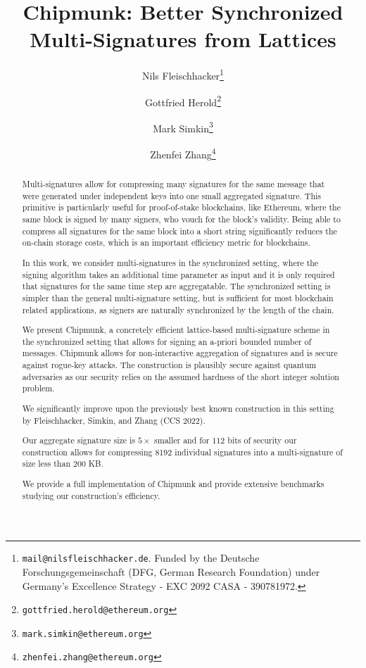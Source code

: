 \documentclass[11pt]{llncs}
\title{Chipmunk: Better Synchronized Multi-Signatures from Lattices}
\author{
 	Nils Fleischhacker\inst{1}\thanks{\texttt{mail@nilsfleischhacker.de}. Funded by the Deutsche Forschungsgemeinschaft (DFG, German Research Foundation) under Germany's Excellence Strategy - EXC 2092 CASA - 390781972.}%
 	\and
 	Gottfried Herold\inst{2}\thanks{\texttt{gottfried.herold@ethereum.org}}%
 	\and
 	Mark Simkin\inst{2}\thanks{\texttt{mark.simkin@ethereum.org}}%
   \and
   Zhenfei Zhang\inst{2}\thanks{\texttt{zhenfei.zhang@ethereum.org}}%
}
\institute{
	 Ruhr University Bochum
	 \and
	 Ethereum Foundation
}
\newif\ifcameraready
\begin{document}
\pagestyle{plain}

\maketitle
\noindent
\makebox[\linewidth]{\small \today}

\begin{abstract}
Multi-signatures allow for compressing many signatures for the same message that were generated under independent keys into one small aggregated signature. 
This primitive is particularly useful for proof-of-stake blockchains, like Ethereum, where the same block is signed by many signers, who vouch for the block's validity.
Being able to compress all signatures for the same block into a short string significantly reduces the on-chain storage costs, which is an important efficiency metric for blockchains.

In this work, we consider multi-signatures in the synchronized setting, where the signing algorithm takes an additional time parameter as input and it is only required that signatures for the same time step are aggregatable.
The synchronized setting is simpler than the general multi-signature setting, but is sufficient for most blockchain related applications, as signers are naturally synchronized by the length of the chain.

We present Chipmunk, a concretely efficient lattice-based multi-signature scheme in the synchronized setting that allows for signing an a-priori bounded number of messages.
Chipmunk allows for non-interactive aggregation of signatures and is secure against rogue-key attacks.
The construction is plausibly secure against quantum adversaries as our security relies on the assumed hardness of the short integer solution problem.

We significantly improve upon the previously best known construction in this setting by Fleischhacker, Simkin, and Zhang (CCS 2022).
\ifcameraready
Our aggregate signature size is $5 \times$ smaller and for $112$ bits of security our construction allows for compressing 8192 individual signatures into a multi-signature of size less than $200$ KB.
\else
Our aggregate signature size is $5 \times$ smaller and for $112$ bits of security our construction allows for compressing 8192 individual signatures into a multi-signature of size less than $200$ KB.
\fi
We provide a full implementation of Chipmunk and provide extensive benchmarks studying our construction's efficiency.

\end{abstract}
\end{document}
